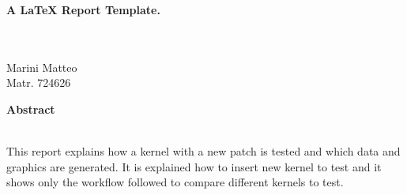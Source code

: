\documentclass[a4paper,10pt]{article}
\newenvironment*{mytitle}{\begin{LARGE}\bf}{\end{LARGE}\\[1.5ex]}%
\newenvironment*{myabstract}{\begin{Large}\bf}{\end{Large}\\[2.5ex]}%
\begin{document}
\begin{mytitle} A LaTeX Report Template. \end{mytitle}
%
%
\\
\hspace{10ex}
Marini Matteo\\
Matr. 724626\\[10ex]

\begin{myabstract} Abstract \end{myabstract}
This report explains how a kernel with a new patch is tested and 
which data and graphics are generated. It is explained how to insert new kernel to test
and it shows only the workflow followed to compare different kernels to test.
\end{document}
